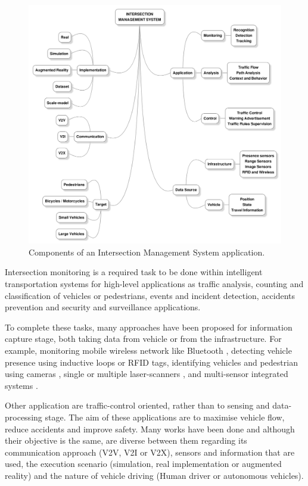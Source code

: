 \begin{figure}[ht!]
\centering
\includegraphics[scale=0.2125]{fig/2/ims_graph2.png}
\caption{Components of an Intersection Management System application.}
\label{fusionAlgs}
\end{figure}

Intersection monitoring is a required task to be done within intelligent transportation systems for high-level applications as traffic analysis, counting and classification of vehicles or pedestrians, events and incident detection, accidents prevention and security and surveillance applications.

To complete these tasks, many approaches have been proposed for information capture stage, both taking data from vehicle or from the infrastructure. For example, monitoring mobile wireless network like Bluetooth \cite{Friesen2013}, detecting vehicle presence using inductive loops or RFID tags, identifying vehicles and pedestrian using cameras \cite{Buch2011, Strigel2013}, single or multiple laser-scanners \cite{Meissner2010, Meissner2012, Zhao2006, Zhao2008, Zhao2012}, and multi-sensor integrated systems \cite{Meissner2013, Meissner2013a, Meissner2014, GoldHammer2012, Zhao2009}.

Other application are traffic-control oriented, rather than to sensing and data-processing stage. The aim of these applications are to maximise vehicle flow, reduce accidents and improve safety. Many works have been done and although their objective is the same, are diverse between them regarding its communication approach (V2V, V2I or V2X), sensors and information that are used, the execution scenario (simulation, real implementation or augmented reality) and the nature of vehicle driving (Human driver or autonomous vehicles).

